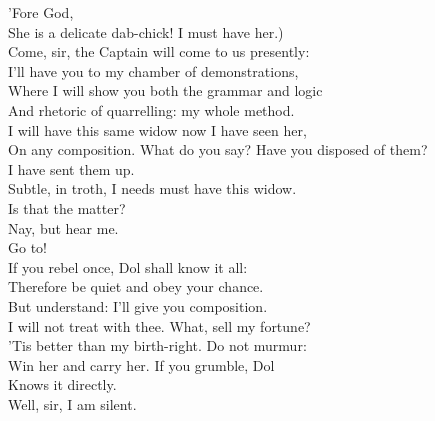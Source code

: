 \documentclass[a4paper,oneside,12pt]{memoir}
\begin{document}
\begin{drama*}
\facespeaks {} 'Fore God,\\
She is a delicate dab-chick! I must have her.)\\
\subtlespeaks {} Come, sir, the Captain will come to us presently:\\
I'll have you to my chamber of demonstrations,\\
Where I will show you both the grammar and logic\\
And rhetoric of quarrelling: my whole method.\\
\facespeaks I will have this same widow now I have seen her,\\
On any composition.
\subtlespeaks {} What do you say?
\facespeaks Have you disposed of them?\\
\subtlespeaks {} I have sent them up.\\
\facespeaks Subtle, in troth, I needs must have this widow.\\
\subtlespeaks Is that the matter?\\
\facespeaks {} Nay, but hear me.\\
\subtlespeaks {} Go to!\\
If you rebel once, Dol shall know it all:\\
Therefore be quiet and obey your chance.\\
\facespeaks But understand: I'll give you composition.\\
\subtlespeaks I will not treat with thee. What, sell my fortune?\\
'Tis better than my birth-right. Do not murmur:\\
Win her and carry her. If you grumble, Dol\\
Knows it directly.\\
\facespeaks {} Well, sir, I am silent.\\

\pagebreak
\scene


\end{drama*}
\end{document}
